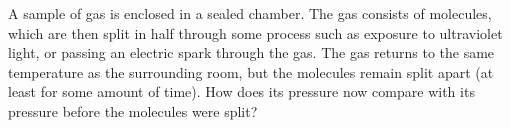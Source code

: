 A sample of gas is enclosed in a sealed chamber. The gas consists of
molecules, which are then split in half through some process such as
exposure to ultraviolet light, or passing an electric spark through the
gas. The gas returns to the same temperature as the surrounding
room, but the molecules remain split apart (at least for some amount
of time). How does its pressure now compare with its pressure before the
molecules were split?

